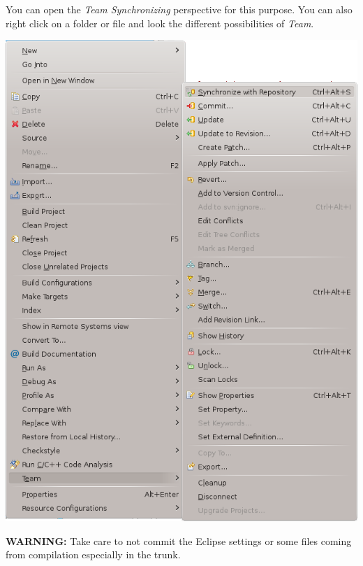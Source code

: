 \documentclass[a4paper]{article}
\begin{document}
You can open the \emph{Team Synchronizing} perspective for this purpose.
You can also right click on a folder or file and look the different possibilities of \emph{Team}.
\begin{center}
\noindent
\includegraphics[scale=0.4]{eclipse/08-eclipseJUNO-synchronization-with-eclipse.png}
\end{center}

{\color{red}\textbf{\color{red} WARNING:} Take care to not commit the Eclipse settings or some files coming from compilation especially in the trunk.}


\newpage

% 
% 
% 
% 
\end{document}
